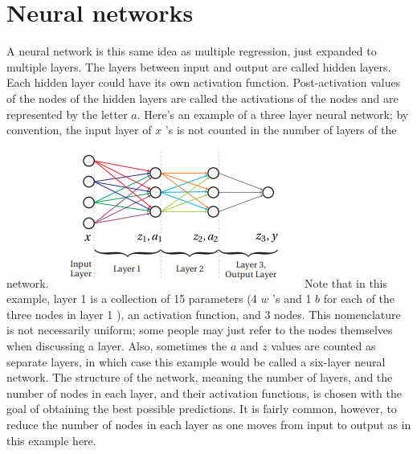 \documentclass{book}
\theoremstyle{plain}
\theoremstyle{definition}
\numberwithin{exm}{chapter}
\theoremstyle{remark}
\theoremstyle{summary}
\theoremstyle{overview}
\begin{document}
\section*{Neural networks}
A neural network is this same idea as multiple regression, just expanded to multiple layers. The layers between input and output are called hidden layers. Each hidden layer could have its own activation function. Post-activation values of the nodes of the hidden layers are called the activations of the nodes and are represented by the letter $a$. Here's an example of a three layer neural network; by convention, the input layer of $x$ 's is not counted in the number of layers of the network.
\includegraphics[width=\marginparwidth]{fig1302}
Note that in this example, layer 1 is a collection of 15 parameters (4 $w$ \rq s and 1 $b$ for each of the three nodes in layer 1 ), an activation function, and 3 nodes. This nomenclature is not necessarily uniform; some people may just refer to the nodes themselves when discussing a layer. Also, sometimes the $a$ and $z$ values are counted as separate layers, in which case this example would be called a six-layer neural network. The structure of the network, meaning the number of layers, and the number of nodes in each layer, and their activation functions, is chosen with the goal of obtaining the best possible predictions. It is fairly common, however, to reduce the number of nodes in each layer as one moves from input to output as in this example here.
\end{document}
